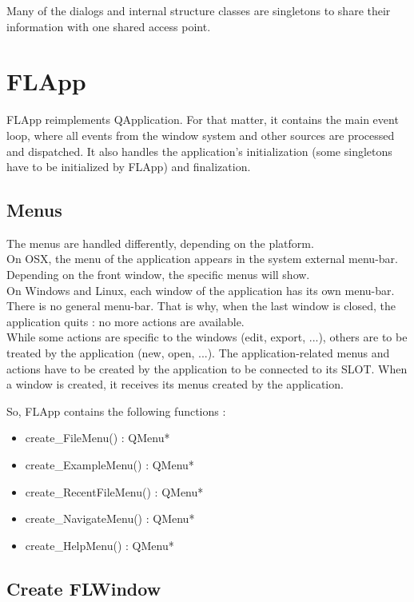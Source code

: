 \documentclass[a4paper]{article}
\begin{document}
Many of the dialogs and internal structure classes are singletons to share their information with one shared access point. 

\section{FLApp}
 
FLApp reimplements QApplication. For that matter, it contains the main event loop, where all events from the window system and other sources are processed and dispatched. It also handles the application's initialization (some singletons have to be initialized by FLApp) and finalization.

\subsection{Menus}

The menus are handled differently, depending on the platform. \\
On OSX, the menu of the application appears in the system external menu-bar. Depending on the front window, the specific menus will show. \\
On Windows and Linux, each window of the application has its own menu-bar. There is no general menu-bar. That is why, when the last window is closed, the application quits : no more actions are available. \\

While some actions are specific to the windows (edit, export, ...), others  are to be treated by the application (new, open, ...). The application-related menus and actions have to be created by the application to be connected to its SLOT. When a window is created, it receives its menus created by the application. 

So, FLApp contains the following functions :
\begin{itemize}
\item create\_FileMenu() : QMenu* 
\item create\_ExampleMenu() : QMenu*
\item create\_RecentFileMenu() : QMenu*
\item create\_NavigateMenu() : QMenu*
\item create\_HelpMenu() : QMenu*
\end{itemize}

\subsection{Create FLWindow}
\end{document}
